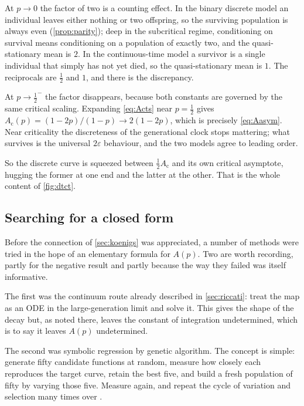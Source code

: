 At $p\to0$ the factor of two is a counting effect. In the binary discrete model an
individual leaves either nothing or two offspring, so the surviving population is
always even (\cref{prop:parity}); deep in the subcritical regime, conditioning on
survival means conditioning on a population of exactly two, and the quasi-stationary
mean is $2$. In the continuous-time model a survivor is a single individual that
simply has not yet died, so the quasi-stationary mean is $1$. The reciprocals are
$\tfrac12$ and $1$, and there is the discrepancy.

At $p\to\tfrac12^-$ the factor disappears, because both constants are governed by the
same critical scaling. Expanding \cref{eq:Acts} near $p=\tfrac12$ gives
$A_{\text{c}}(p) = (1-2p)/(1-p) \to 2(1-2p)$, which is precisely \cref{eq:Aasym}. Near
criticality the discreteness of the generational clock stops mattering; what
survives is the universal $2\varepsilon$ behaviour, and the two models agree to
leading order.

So the discrete curve is squeezed between $\tfrac12 A_{\text{c}}$ and its own critical
asymptote, hugging the former at one end and the latter at the other. That is the
whole content of \cref{fig:dtct}.

\subsection{Searching for a closed form}
\label{sec:GA}

Before the connection of \cref{sec:koenigs} was appreciated, a number of methods were
tried in the hope of an elementary formula for $A(p)$. Two are worth recording,
partly for the negative result and partly because the way they failed was itself
informative.

The first was the continuum route already described in \cref{sec:riccati}: treat the
map as an ODE in the large-generation limit and solve it. This gives the shape of the
decay but, as noted there, leaves the constant of integration undetermined, which is
to say it leaves $A(p)$ undetermined.

The second was symbolic regression by genetic algorithm. The concept is simple:
generate fifty candidate functions at random, measure how closely each reproduces the
target curve, retain the best five, and build a fresh population of fifty by varying
those five. Measure again, and repeat the cycle of variation and selection many times
over \cite{stanley2002evolving,cohen2024physics}.

